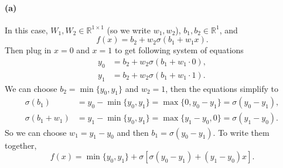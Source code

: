 \documentclass[12pt]{article}
\begin{document}
\paragraph{(a)}
In this case, \(W_1, W_2\in\mathbb{R}^{1\times1}\) (so we write \(w_1, w_2\)), \(b_1,b_2\in\mathbb{R}^1\), and
\[ f(x) = b_2 + w_2 \sigma(b_1 + w_1 x). \]
Then plug in \(x=0\) and \(x=1\) to get following system of equations
\begin{align*}
    y_0 &= b_2 + w_2 \sigma(b_1+w_1\cdot0), \\
    y_1 &= b_2 + w_2 \sigma(b_1+w_1\cdot1).
\end{align*}
We can choose \(b_2 = \min\{y_0, y_1\}\) and \(w_2=1\), then the equations simplify to
\begin{align*}
    \sigma(b_1) &= y_0 - \min\{y_0, y_1\} = \max\{0, y_0-y_1\} = \sigma(y_0-y_1), \\
    \sigma(b_1 + w_1) &= y_1 - \min\{y_0, y_1\} = \max\{y_1-y_0, 0\} = \sigma(y_1-y_0).
\end{align*}
So we can choose \(w_1=y_1-y_0\) and then \(b_1=\sigma(y_0-y_1)\).
To write them together,
\[ f(x) = \min\{y_0, y_1\} + \sigma[\sigma(y_0-y_1)+(y_1-y_0)x]. \]
\end{document}

